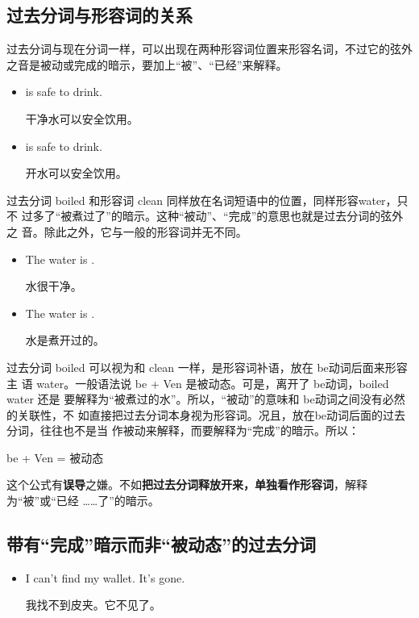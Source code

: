 \subsection{过去分词与形容词的关系}

过去分词与现在分词一样，可以出现在两种形容词位置来形容名词，不过它的弦外之音是被动或完成的暗示，要加上“被”、“已经”来解释。

\begin{itemize}
\item {} is safe to drink.

干净水可以安全饮用。
\item {} is safe to drink.

开水可以安全饮用。
\end{itemize}

过去分词 boiled 和形容词 clean 同样放在名词短语中的位置，同样形容water，只不
过多了“被煮过了”的暗示。这种“被动”、“完成”的意思也就是过去分词的弦外之
音。除此之外，它与一般的形容词并无不同。

\begin{itemize}
\item The water is .

水很干净。
\item The water is .

水是煮开过的。
\end{itemize}

过去分词 boiled 可以视为和 clean 一样，是形容词补语，放在 be动词后面来形容主
语 water。一般语法说 be + Ven 是被动态。可是，离开了 be动词，boiled water 还是
要解释为“被煮过的水”。所以，“被动”的意味和 be动词之间没有必然的关联性，不
如直接把过去分词本身视为形容词。况且，放在be动词后面的过去分词，往往也不是当
作被动来解释，而要解释为“完成”的暗示。所以：

be + Ven = 被动态

这个公式有\textbf{误导}之嫌。不如\textbf{把过去分词释放开来，单独看作形容词}，解释为“被”或“已经 \ldots \ldots 了”的暗示。

\subsection{带有“完成”暗示而非“被动态”的过去分词}

\begin{itemize}
\item  I can't find my wallet. It's gone.

  我找不到皮夹。它不见了。
\end{itemize}

